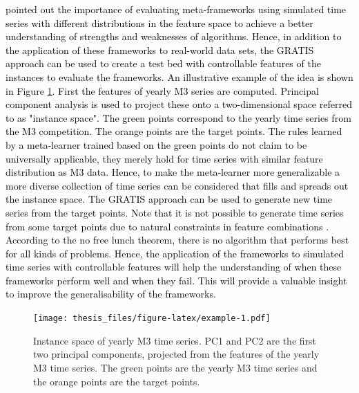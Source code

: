 \documentclass{monashthesis}
\begin{document}
\begin{enumerate}
  \textcite{smith2015generating} \textcolor{black}{pointed out the importance of evaluating meta-frameworks using simulated time series with different distributions in the feature space to achieve a better understanding of strengths and weaknesses of algorithms. Hence, in addition to the application of these frameworks to real-world data sets, the GRATIS} \autocite{kang2019gratis} \textcolor{black}{approach can be used to create a test bed with controllable features of the instances to evaluate the frameworks. An illustrative example of the idea is shown in Figure} \ref{fig:example}\textcolor{black}{. First the features of yearly M3 series are computed. Principal component analysis is used to project these onto a two-dimensional space referred to as "instance space".  The green points correspond to the yearly time series from the M3 competition. The orange points are the target points. The rules learned by a meta-learner trained based on the green points do not claim to be universally applicable, they merely hold for time series with similar feature distribution as M3 data. Hence, to make the meta-learner more generalizable a more diverse collection of time series can be considered that fills and spreads out the instance space. The GRATIS approach can be used to   generate new time series from the target points. Note that it is not possible to generate time series from some target points due to natural constraints in feature combinations} \autocite{kang2017visualising}\textcolor{black}{. According to the no free lunch theorem, there is no algorithm that performs best for all kinds of problems. Hence, the application of the frameworks to simulated time series with controllable features will help the understanding of when these frameworks perform well and when they fail. This will provide a valuable insight to improve the generalisability of the frameworks.}
\end{enumerate}

\begin{figure}
\centering
\texttt{[image: thesis\_files/figure-latex/example-1.pdf]}
\caption{\label{fig:example}Instance space of yearly M3 time series. PC1 and PC2 are the first two principal components, projected from the features of the yearly M3 time series. The green points are the yearly M3 time series and the orange points are the target points.}
\end{figure}

\newpage
\end{document}
